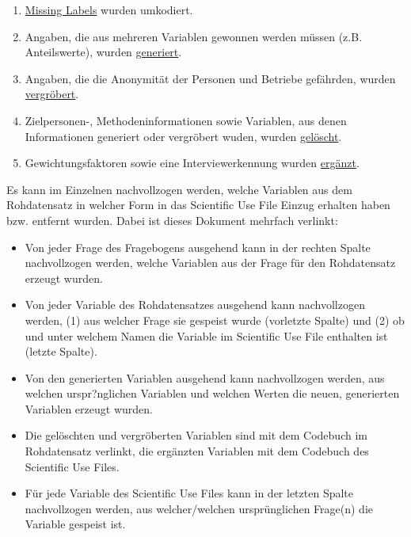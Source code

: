 \begin{enumerate}

\item \hyperref[var_miss]{Missing Labels} wurden umkodiert.
\item Angaben, die aus mehreren Variablen gewonnen werden müssen (z.B. Anteilswerte), wurden \hyperref[var_generiert]{generiert}.
\item Angaben, die die Anonymität der Personen und Betriebe gefährden, wurden \hyperref[var_kategorisiert]{vergröbert}.
\item Zielpersonen-, Methodeninformationen sowie Variablen, aus denen Informationen generiert oder vergröbert wuden, wurden \hyperref[var_geloescht]{gelöscht}.
\item Gewichtungsfaktoren sowie eine Interviewerkennung  wurden \hyperref[var_ergaenzt]{ergänzt}.

\end{enumerate}

Es kann im Einzelnen nachvollzogen werden, welche Variablen aus dem Rohdatensatz in welcher Form in das Scientific Use File Einzug erhalten haben bzw. entfernt wurden. Dabei ist dieses Dokument mehrfach verlinkt:

\begin{itemize}

\item Von jeder Frage des Fragebogens ausgehend kann in der rechten Spalte nachvollzogen werden, welche Variablen aus der Frage für den Rohdatensatz erzeugt wurden. 

\item Von jeder Variable des Rohdatensatzes ausgehend kann nachvollzogen werden, (1) aus welcher Frage sie gespeist wurde (vorletzte Spalte) und (2) ob und unter welchem Namen die Variable im Scientific Use File enthalten ist (letzte Spalte).

\item Von den generierten Variablen ausgehend kann nachvollzogen werden, aus welchen urspr?nglichen Variablen und welchen Werten die neuen, generierten Variablen erzeugt wurden. 

\item Die gelöschten und vergröberten Variablen sind mit dem Codebuch im Rohdatensatz verlinkt, die ergänzten Variablen mit dem Codebuch des Scientific Use Files.

\item Für jede Variable des Scientific Use Files kann in der letzten Spalte nachvollzogen werden, aus welcher/welchen ursprünglichen Frage(n) die Variable gespeist ist. 

\end{itemize}

